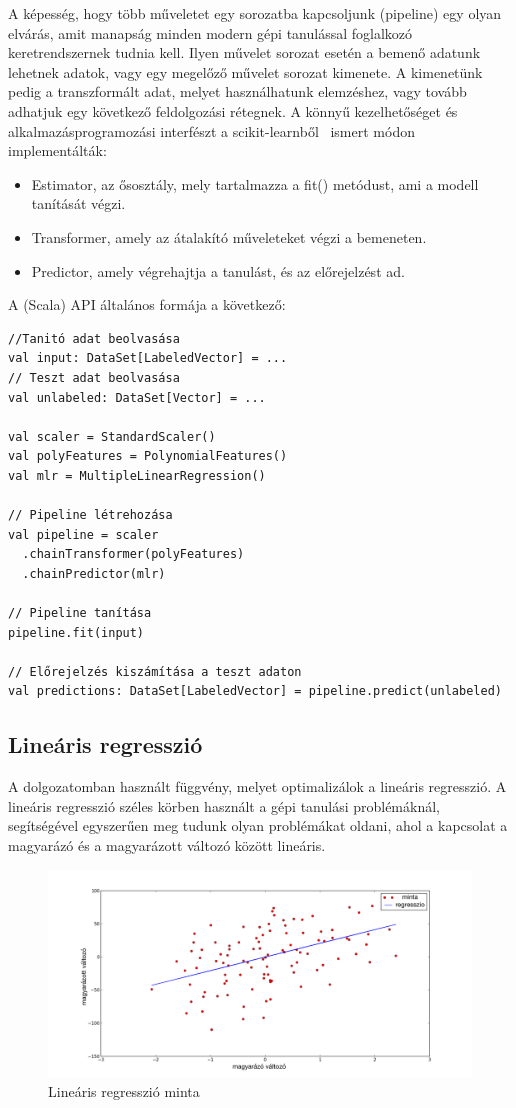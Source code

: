 \documentclass[a4paper,12pt]{article}
\begin{document}
A képesség, hogy több műveletet egy sorozatba kapcsoljunk (pipeline) egy olyan elvárás, amit manapság minden modern gépi tanulással foglalkozó keretrendszernek tudnia kell. Ilyen művelet sorozat esetén a bemenő adatunk lehetnek adatok, vagy egy megelőző művelet sorozat kimenete. A kimenetünk pedig a transzformált adat, melyet használhatunk elemzéshez, vagy tovább adhatjuk egy következő feldolgozási rétegnek.  A könnyű kezelhetőséget és alkalmazásprogramozási interfészt a scikit-learnből~\cite{sciapi} ismert módon implementálták: 
\begin{itemize}
\item Estimator, az ősosztály, mely tartalmazza a fit() metódust, ami a modell tanítását végzi.
\item Transformer, amely az átalakító műveleteket végzi a bemeneten.
\item Predictor, amely végrehajtja a tanulást, és az előrejelzést ad.
\end{itemize}

A (Scala) API általános formája a következő:

\begin{lstlisting}[style=Scala]
//Tanitó adat beolvasása
val input: DataSet[LabeledVector] = ...
// Teszt adat beolvasása
val unlabeled: DataSet[Vector] = ...

val scaler = StandardScaler()
val polyFeatures = PolynomialFeatures()
val mlr = MultipleLinearRegression()

// Pipeline létrehozása
val pipeline = scaler
  .chainTransformer(polyFeatures)
  .chainPredictor(mlr)

// Pipeline tanítása
pipeline.fit(input)

// Előrejelzés kiszámítása a teszt adaton
val predictions: DataSet[LabeledVector] = pipeline.predict(unlabeled)
\end{lstlisting}

\subsection{Lineáris regresszió}

A dolgozatomban használt függvény, melyet optimalizálok a lineáris regresszió. A lineáris regresszió széles körben használt a gépi tanulási problémáknál, segítségével egyszerűen meg tudunk olyan problémákat oldani, ahol a kapcsolat a magyarázó és a magyarázott változó között lineáris. 
\begin{figure}[H]
\centering
\includegraphics[width=130mm]{img/linreg.png}
\caption{Lineáris regresszió minta} \label{}
\end{figure}
\end{document}
